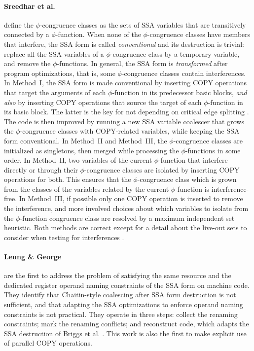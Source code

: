 \paragraph{Sreedhar et al. \cite{Sreedhar:1999:SAS}} define the
$\phi$-congruence classes as the sets of SSA variables that are transitively
connected by a $\phi$-function. When none of the $\phi$-congruence classes have
members that interfere, the SSA form is called \emph{conventional} and its
destruction is trivial: replace all the SSA variables of a $\phi$-congruence
class by a temporary variable, and remove the $\phi$-functions. In general, the
SSA form is \emph{transformed} after program optimizations, that is, some
$\phi$-congruence classes contain interferences.  In Method~I, the SSA form is
made conventional by inserting COPY operations that target the arguments of each
$\phi$-function in its predecessor basic blocks, \emph{and also} by inserting
COPY operations that source the target of each $\phi$-function in its basic
block. The latter is the key for not depending on critical edge splitting
\cite{Boissinot:2009:CGO}. The code is then improved by running a new SSA
variable coalescer that grows the $\phi$-congruence classes with COPY-related
variables, while keeping the SSA form conventional. In Method~II and Method~III, the
$\phi$-congruence classes are initialized as singletons, then merged while
processing the $\phi$-functions in some order. In Method~II, two variables of
the current $\phi$-function that interfere directly or through their
$\phi$-congruence classes are isolated by inserting COPY operations for both.
This ensures that the $\phi$-congruence class which is grown from the classes of
the variables related by the current $\phi$-function is interference-free. In
Method~III, if possible only one COPY operation is inserted to remove the
interference, and more involved choices about which variables to isolate from
the $\phi$-function congruence class are resolved by a maximum independent set
heuristic.  Both methods are correct except for a detail about the live-out sets
to consider when testing for interferences \cite{Boissinot:2009:CGO}.

\paragraph{Leung \& George \cite{Leung:1999:PLDI}} are the first to address the
problem of satisfying the {same resource} and the {dedicated register} operand
naming constraints of the SSA form on machine code. They identify that
Chaitin-style coalescing after SSA form destruction is not sufficient, and that
adapting the SSA optimizations to enforce operand naming constraints is not
practical.  They operate in three steps: collect the renaming constraints; mark
the renaming conflicts; and reconstruct code, which adapts the SSA destruction
of Briggs et al. \cite{Briggs:1998:SPE}. This work is also the first to make
explicit use of parallel COPY operations.

